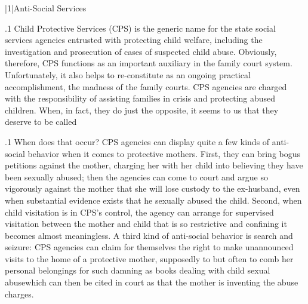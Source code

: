 \documentclass[11pt, twoside]{article}
\begin{document}
\thispagestyle{empty}

{\fontsize{13}{19}\selectfont


\hspace{-5em}\begin{minipage}{1.1\textwidth}
\begin{flushright}
{\fontsize{14}{22}\selectfont
\textbf{%
}
}
\end{flushright}
\end{minipage}


\vspace{6em}





\s|1|{Anti-Social Services}

\p.1{%
\noindent{}Child Protective Services (CPS) is the generic name for the state social
services agencies entrusted with protecting child welfare, including the
investigation and prosecution of cases of suspected child abuse. Obviously, therefore, CPS functions as an important auxiliary in the family
court system. Unfortunately, it also helps to re-constitute as an ongoing
practical accomplishment, the madness of the family courts. CPS agencies are charged with the responsibility of assisting families in crisis and
protecting abused children. When, in fact, they do just the opposite, it
seems to us that they deserve to be called 
}%

\p.1{%
When does that occur? CPS agencies can display quite a few kinds of
anti-social behavior when it comes to protective mothers. First, they can
bring bogus petitions against the mother, charging her with  her child into believing they have been sexually abused; then the
agencies can come to court and argue so vigorously against the mother
that she will lose custody to the ex-husband, even when substantial
evidence exists that he sexually abused the child. Second, when child
visitation is in CPS's control, the agency can arrange for supervised visitation between the mother and child that is so restrictive and confining
it becomes almost meaningless. A third kind of anti-social behavior is
search and seizure: CPS agencies can claim for themselves the right to
make unannounced visits to the home of a protective mother, supposedly to  but often to comb her personal belongings for such
damning  as books dealing with child sexual abuse\mdash{}which
can then be cited in court as  that the mother is inventing the
abuse charges.
}%

}
\end{document}
